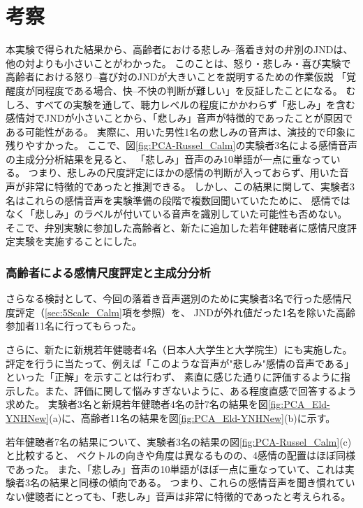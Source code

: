 \newpage
\section{考察}
本実験で得られた結果から、高齢者における悲しみ--落着き対の弁別のJNDは、他の対よりも小さいことがわかった。
このことは、怒り・悲しみ・喜び実験で高齢者における怒り--喜び対のJNDが大きいことを説明するための作業仮説
「覚醒度が同程度である場合、快--不快の判断が難しい」を反証したことになる。
むしろ、すべての実験を通して、聴力レベルの程度にかかわらず「悲しみ」を含む感情対でJNDが小さいことから、「悲しみ」音声が特徴的であったことが原因である可能性がある。
実際に、用いた男性1名の悲しみの音声は、演技的で印象に残りやすかった。
ここで、図\ref{fig:PCA-Russel_Calm}の実験者3名による感情音声の主成分分析結果を見ると、
「悲しみ」音声のみ10単語が一点に重なっている。
つまり、悲しみの尺度評定にほかの感情の判断が入っておらず、用いた音声が非常に特徴的であったと推測できる。
しかし、この結果に関して、実験者3名はこれらの感情音声を実験準備の段階で複数回聞いていたために、
感情ではなく「悲しみ」のラベルが付いている音声を識別していた可能性も否めない。
そこで、弁別実験に参加した高齢者と、新たに追加した若年健聴者に感情尺度評定実験を実施することにした。


\subsubsection{高齢者による感情尺度評定と主成分分析}
さらなる検討として、今回の落着き音声選別のために実験者3名で行った感情尺度評定（\ref{sec:5Scale_Calm}項を参照）を、
JNDが外れ値だった1名を除いた高齢参加者11名に行ってもらった。

さらに、新たに新規若年健聴者4名（日本人大学生と大学院生）にも実施した。
評定を行うに当たって、例えば「このような音声が"悲しみ"感情の音声である」といった「正解」を示すことは行わず、
素直に感じた通りに評価するように指示した。また、評価に関して悩みすぎないように、ある程度直感で回答するよう求めた。
実験者3名と新規若年健聴者4名の計7名の結果を図\ref{fig:PCA_Eld-YNHNew}(a)に、高齢者11名の結果を図\ref{fig:PCA_Eld-YNHNew}(b)に示す。



若年健聴者7名の結果について、実験者3名の結果の図\ref{fig:PCA-Russel_Calm}(c)と比較すると、
ベクトルの向きや角度は異なるものの、4感情の配置はほぼ同様であった。
また、「悲しみ」音声の10単語がほぼ一点に重なっていて、これは実験者3名の結果と同様の傾向である。
つまり、これらの感情音声を聞き慣れていない健聴者にとっても、「悲しみ」音声は非常に特徴的であったと考えられる。



